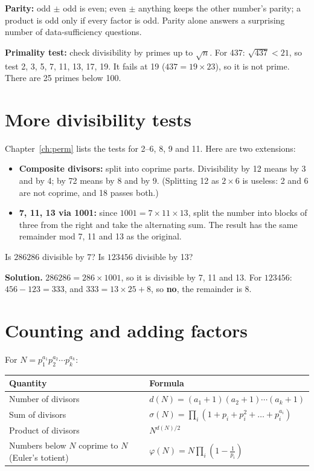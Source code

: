 \documentclass[11pt,a4paper,openany]{report}
\begin{document}
\textbf{Parity:} odd $\pm$ odd is even; even $\pm$ anything keeps the other number's parity; a product is odd only if every factor is odd. Parity alone answers a surprising number of data-sufficiency questions.

\textbf{Primality test:} check divisibility by primes up to $\sqrt n$. For 437: $\sqrt{437}<21$, so test 2, 3, 5, 7, 11, 13, 17, 19. It fails at 19 ($437=19\times23$), so it is not prime. There are 25 primes below 100.

\section{More divisibility tests}
Chapter~\ref{ch:perm} lists the tests for 2--6, 8, 9 and 11. Here are two extensions:
\begin{itemize}
\item \textbf{Composite divisors:} split into coprime parts. Divisibility by 12 means by 3 and by 4; by 72 means by 8 and by 9. (Splitting 12 as $2\times6$ is useless: 2 and 6 are not coprime, and 18 passes both.)
\item \textbf{7, 11, 13 via 1001:} since $1001=7\times11\times13$, split the number into blocks of three from the right and take the alternating sum. The result has the same remainder mod 7, 11 and 13 as the original.
\end{itemize}
\begin{example}
Is $286286$ divisible by 7? Is $123456$ divisible by 13?

\textbf{Solution.} $286286=286\times1001$, so it is divisible by 7, 11 and 13. For $123456$: $456-123=333$, and $333=13\times25+8$, so \textbf{no}, the remainder is 8.
\end{example}

\section{Counting and adding factors}
For $N=p_1^{a_1}p_2^{a_2}\cdots p_k^{a_k}$:
\begin{center}
\begin{tabular}{ll}
\toprule
Quantity & Formula\\\midrule
Number of divisors & $d(N)=(a_1+1)(a_2+1)\cdots(a_k+1)$\\
Sum of divisors & $\sigma(N)=\prod_i(1+p_i+p_i^2+\dots+p_i^{a_i})$\\
Product of divisors & $N^{d(N)/2}$\\
Numbers below $N$ coprime to $N$ (Euler's totient) & $\varphi(N)=N\prod_i\left(1-\frac1{p_i}\right)$\\
\bottomrule
\end{tabular}
\end{center}
\end{document}
